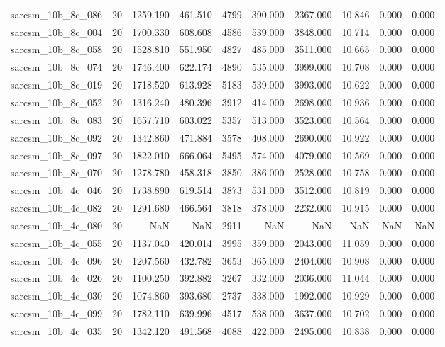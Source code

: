 \begin{tabular}{lrrrrrrrrr}
sarcsm\_10b\_8c\_086 & 20 & 1259.190 & 461.510 & 4799 & 390.000 & 2367.000 & 10.846 & 0.000 & 0.000 \\
sarcsm\_10b\_8c\_004 & 20 & 1700.330 & 608.608 & 4586 & 539.000 & 3848.000 & 10.714 & 0.000 & 0.000 \\
sarcsm\_10b\_8c\_058 & 20 & 1528.810 & 551.950 & 4827 & 485.000 & 3511.000 & 10.665 & 0.000 & 0.000 \\
sarcsm\_10b\_8c\_074 & 20 & 1746.400 & 622.174 & 4890 & 535.000 & 3999.000 & 10.708 & 0.000 & 0.000 \\
sarcsm\_10b\_8c\_019 & 20 & 1718.520 & 613.928 & 5183 & 539.000 & 3993.000 & 10.622 & 0.000 & 0.000 \\
sarcsm\_10b\_8c\_052 & 20 & 1316.240 & 480.396 & 3912 & 414.000 & 2698.000 & 10.936 & 0.000 & 0.000 \\
sarcsm\_10b\_8c\_083 & 20 & 1657.710 & 603.022 & 5357 & 513.000 & 3523.000 & 10.564 & 0.000 & 0.000 \\
sarcsm\_10b\_8c\_092 & 20 & 1342.860 & 471.884 & 3578 & 408.000 & 2690.000 & 10.922 & 0.000 & 0.000 \\
sarcsm\_10b\_8c\_097 & 20 & 1822.010 & 666.064 & 5495 & 574.000 & 4079.000 & 10.569 & 0.000 & 0.000 \\
sarcsm\_10b\_8c\_070 & 20 & 1278.780 & 458.318 & 3850 & 386.000 & 2528.000 & 10.758 & 0.000 & 0.000 \\
sarcsm\_10b\_4c\_046 & 20 & 1738.890 & 619.514 & 3873 & 531.000 & 3512.000 & 10.819 & 0.000 & 0.000 \\
sarcsm\_10b\_4c\_082 & 20 & 1291.680 & 466.564 & 3818 & 378.000 & 2232.000 & 10.915 & 0.000 & 0.000 \\
sarcsm\_10b\_4c\_080 & 20 & NaN & NaN & 2911 & NaN & NaN & NaN & NaN & NaN \\
sarcsm\_10b\_4c\_055 & 20 & 1137.040 & 420.014 & 3995 & 359.000 & 2043.000 & 11.059 & 0.000 & 0.000 \\
sarcsm\_10b\_4c\_096 & 20 & 1207.560 & 432.782 & 3653 & 365.000 & 2404.000 & 10.908 & 0.000 & 0.000 \\
sarcsm\_10b\_4c\_026 & 20 & 1100.250 & 392.882 & 3267 & 332.000 & 2036.000 & 11.044 & 0.000 & 0.000 \\
sarcsm\_10b\_4c\_030 & 20 & 1074.860 & 393.680 & 2737 & 338.000 & 1992.000 & 10.929 & 0.000 & 0.000 \\
sarcsm\_10b\_4c\_099 & 20 & 1782.110 & 639.996 & 4517 & 538.000 & 3637.000 & 10.702 & 0.000 & 0.000 \\
sarcsm\_10b\_4c\_035 & 20 & 1342.120 & 491.568 & 4088 & 422.000 & 2495.000 & 10.838 & 0.000 & 0.000 \\

\end{tabular}
